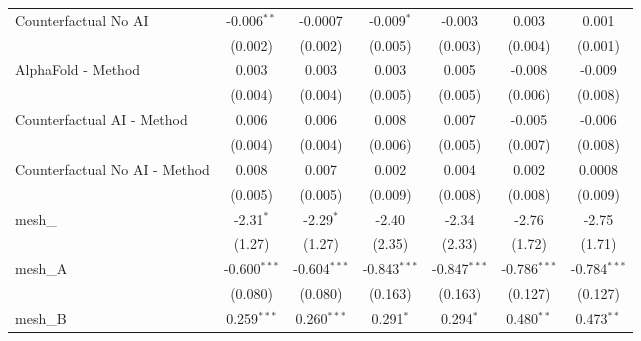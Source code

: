 \begin{tabular}{lcccccc}
   Counterfactual No AI                                        & -0.006$^{**}$  & -0.0007        & -0.009$^{*}$   & -0.003         & 0.003          & 0.001\\   
                                                               & (0.002)        & (0.002)        & (0.005)        & (0.003)        & (0.004)        & (0.001)\\   
   AlphaFold - Method                                          & 0.003          & 0.003          & 0.003          & 0.005          & -0.008         & -0.009\\   
                                                               & (0.004)        & (0.004)        & (0.005)        & (0.005)        & (0.006)        & (0.008)\\   
   Counterfactual AI - Method                                  & 0.006          & 0.006          & 0.008          & 0.007          & -0.005         & -0.006\\   
                                                               & (0.004)        & (0.004)        & (0.006)        & (0.005)        & (0.007)        & (0.008)\\   
   Counterfactual No AI - Method                               & 0.008          & 0.007          & 0.002          & 0.004          & 0.002          & 0.0008\\   
                                                               & (0.005)        & (0.005)        & (0.009)        & (0.008)        & (0.008)        & (0.009)\\   
   mesh\_                                                      & -2.31$^{*}$    & -2.29$^{*}$    & -2.40          & -2.34          & -2.76          & -2.75\\   
                                                               & (1.27)         & (1.27)         & (2.35)         & (2.33)         & (1.72)         & (1.71)\\   
   mesh\_A                                                     & -0.600$^{***}$ & -0.604$^{***}$ & -0.843$^{***}$ & -0.847$^{***}$ & -0.786$^{***}$ & -0.784$^{***}$\\   
                                                               & (0.080)        & (0.080)        & (0.163)        & (0.163)        & (0.127)        & (0.127)\\   
   mesh\_B                                                     & 0.259$^{***}$  & 0.260$^{***}$  & 0.291$^{*}$    & 0.294$^{*}$    & 0.480$^{**}$   & 0.473$^{**}$\\   

\end{tabular}
